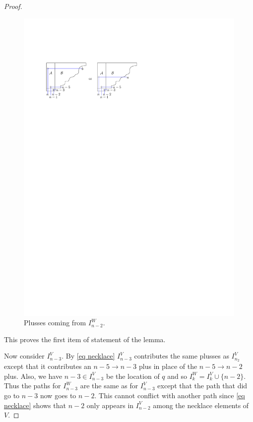 \documentclass[11pt]{article}
\theoremstyle{remark}
\theoremstyle{definition}
\begin{document}
\begin{proof}
  \begin{figure}
     \includegraphics{messyD}
    \caption{Plusses coming from $I_{n-2}^{W}$.}\label{fig messyD}
  \end{figure}

  This proves the first item of statement of the lemma.

  Now consider $I_{n-3}^{V}$.  By \eqref{eq necklace} $I_{n-3}^{V}$ contributes the same plusses as $I_{n_2}^{V}$ except that it contributes an $n-5\rightarrow n-3$ plus in place of the $n-5\rightarrow n-2$ plus.  Also, we have $n-3\in I_{n-3}^{V}$ be the location of $q$ and so $I_{k}^{W} = I_k^{V}\cup\{n-2\}$.  Thus the paths for $I^{W}_{n-3}$ are the same as for $I^{V}_{n-3}$ except that the path that did go to $n-3$ now goes to $n-2$.  This cannot conflict with another path since \eqref{eq necklace} shows that $n-2$ only appears in $I_{n-2}^{V}$ among the necklace elements of $V$.


\end{proof}
\end{document}
